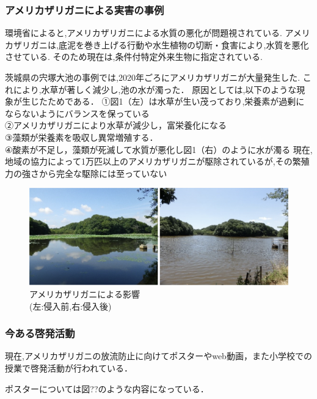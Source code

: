\documentclass[12pt,a4j,titlepage]{ltjsarticle}
\begin{document}
\subsubsection{アメリカザリガニによる実害の事例}
環境省によると,アメリカザリガニによる水質の悪化が問題視されている.
アメリカザリガニは,底泥を巻き上げる行動や水生植物の切断・食害により,水質を悪化させている.
そのため現在は,条件付特定外来生物に指定されている.　

茨城県の宍塚大池の事例では,2020年ごろにアメリカザリガニが大量発生した.
これにより,水草が著しく減少し,池の水が濁った．
原因としては,以下のような現象が生じたためである．
①図1（左）は水草が生い茂っており,栄養素が過剰にならないようにバランスを保っている\\
②アメリカザリガニにより水草が減少し，富栄養化になる\\
③藻類が栄養素を吸収し異常増殖する．\\
④酸素が不足し，藻類が死滅して水質が悪化し図1（右）のように水が濁る
現在,地域の協力によって1万匹以上のアメリカザリガニが駆除されているが,その繁殖力の強さから完全な駆除には至っていない

\begin{figure}[h]
\begin{center}
  \includegraphics[width=.95\columnwidth]{suisitsu.jpg}
\end{center}
  \caption{アメリカザリガニによる影響\\(左:侵入前,右:侵入後)}
  \label{fig:切り替え}
\end{figure}

\subsubsection{今ある啓発活動}
現在,アメリカザリガニの放流防止に向けてポスターやweb動画，また小学校での授業で啓発活動が行われている．

ポスターについては図??のような内容になっている．

\end{document}
